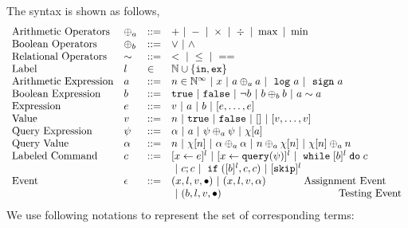 The syntax is shown as follows,
\[
\begin{array}{llll}
\mbox{Arithmetic Operators} 
& \oplus_a & ::= & + ~|~ - ~|~ \times 
%
~|~ \div ~|~ \max ~|~ \min\\  
\mbox{Boolean Operators} 
& \oplus_b & ::= & \lor ~|~ \land
\\
%
\mbox{Relational Operators} 
& \sim & ::= & < ~|~ \leq ~|~ == 
\\  
%
\mbox{Label} 
& l & \in & \mathbb{N} \cup \{\lin, \lex\} 
\\ 
%
\mbox{Arithmetic Expression} 
& \aexpr & ::= & 
n \in \mathbb{N}^{\infty} ~|~ {x} ~|~ \aexpr \oplus_a \aexpr 
 ~|~ \elog \aexpr  ~|~ \esign \aexpr
\\
%
\mbox{Boolean Expression} & \bexpr & ::= & 
%
\etrue ~|~ \efalse  ~|~ \neg \bexpr
 ~|~ \bexpr \oplus_b \bexpr
%
~|~ \aexpr \sim \aexpr 
\\
%
\mbox{Expression} & \expr & ::= & v ~|~ \aexpr ~|~ \bexpr ~|~ [\expr, \dots, \expr]
\\  
%
\mbox{Value} 
& v & ::= & { n ~|~ \etrue ~|~ \efalse ~|~ [] ~|~ [v, \dots, v]}  
\\
%
\mbox{Query Expression} 
& {\qexpr} & ::= 
& { \qval ~|~ \aexpr ~|~ \qexpr \oplus_a \qexpr ~|~ \chi[\aexpr]} 
\\
%
\mbox{Query Value} & \qval & ::= 
& {n ~|~ \chi[n] ~|~ \qval \oplus_a  \qval ~|~ n \oplus_a  \chi[n]
    ~|~ \chi[n] \oplus_a  n}
    \\
\mbox{Labeled Command} 
& {c} & ::= &   [\assign {{x}}{ {\expr}}]^{l} ~|~  [\assign {{x} } {{\query(\qexpr)}}]^{l}
~|~ {\ewhile [ \bexpr ]^{l} \edo {c} }
\\
&&&
~|~ {c};{c}  
~|~ \eif([\bexpr]{}^l , {c}, {c}) 
~|~ [\eskip]^l\\ 
\mbox{Event} 
& \event & ::= & 
    ({x}, l, v, \bullet) ~|~ ({x}, l, v, \qval)  ~~~~~~~~~~~ \mbox{Assignment Event} \\
&&& ~|~(\bexpr, l, v, \bullet)   ~~~~~~~~~~~~~~~~~~~~~~~~~~~~~~~~~~ \mbox{Testing Event}
\\
\end{array}
\]
We use following notations to represent the set of corresponding terms:
